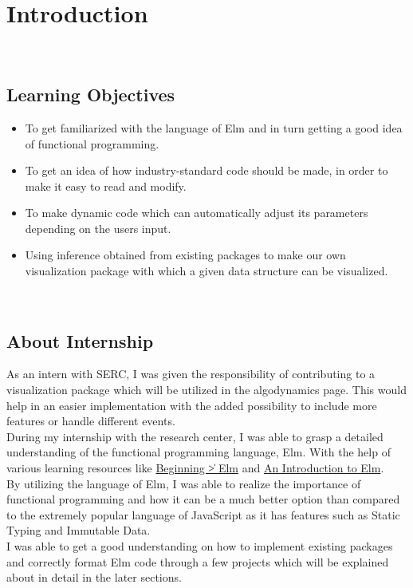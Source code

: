 \cleardoublepage

\section{Introduction}
\\[1in]
\begin{FlushLeft}

\subsection{Learning Objectives}
\begin{itemize}
    \item To get familiarized with the language of Elm and in turn getting a good idea of functional programming.
    \item To get an idea of how industry-standard code should be made, in order to make it easy to read and modify.
    \item To make dynamic code which can automatically adjust its parameters depending on the users input.
    \item Using inference obtained from existing packages to make our own visualization package with which a given data structure can be visualized. 
\end{itemize}
\\[0.5in]
\subsection{About Internship}
As an intern with SERC, I was given the responsibility of contributing to a visualization package which will be utilized in the algodynamics page. This would help in an easier implementation with the added possibility to include more features or handle different events.\\ [0.1in]
During my internship with the research center, I was able to grasp a detailed understanding of the functional programming language, Elm. With the help of various learning resources like \href{https://elmprogramming.com/}{Beginning \|> Elm} and \href{https://guide.elm-lang.org/}{An Introduction to Elm}.\\[0.1in]
By utilizing the language of Elm, I was able to realize the importance of functional programming and how it can be a much better option than compared to the extremely popular language of JavaScript as it has features such as Static Typing and Immutable Data.\\[0.1in]

I was able to get a good understanding on how to implement existing packages and correctly format Elm code through a few projects which will be explained about in detail in the later sections.\\[0.1in]
\end{FlushLeft}
